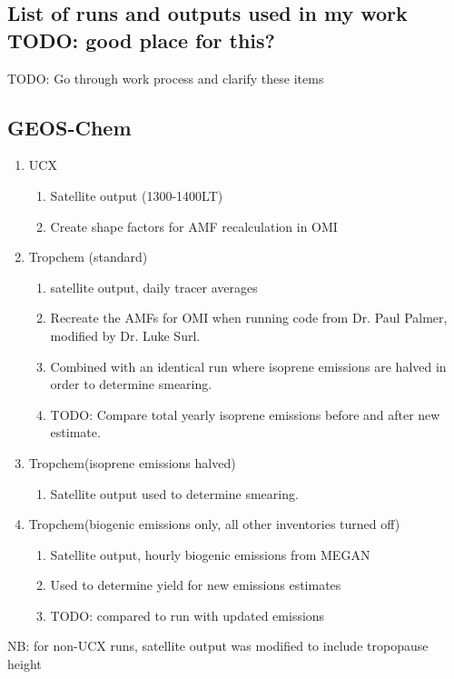   

  \subsection{List of runs and outputs used in my work TODO: good place for this?}
    TODO: Go through work process and clarify these items
    \subsection{GEOS-Chem}
      \begin{enumerate}
        \item UCX 
        \begin{enumerate}
          \item Satellite output (1300-1400LT)
          \item Create shape factors for AMF recalculation in OMI
        \end{enumerate}
        
        \item Tropchem (standard)
        \begin{enumerate}
          \item satellite output, daily tracer averages
          \item Recreate the AMFs for OMI when running code from Dr. Paul Palmer, modified by Dr. Luke Surl.
          \item Combined with an identical run where isoprene emissions are halved in order to determine smearing.
          \item TODO: Compare total yearly isoprene emissions before and after new estimate.
        \end{enumerate}
      
        \item Tropchem(isoprene emissions halved)
        \begin{enumerate}
          \item Satellite output used to determine smearing.
        \end{enumerate}
      
        \item Tropchem(biogenic emissions only, all other inventories turned off)
        \begin{enumerate}
          \item Satellite output, hourly biogenic emissions from MEGAN
          \item Used to determine yield for new emissions estimates
          \item TODO: compared to run with updated emissions
        \end{enumerate}
      \end{enumerate}
      NB: for non-UCX runs, satellite output was modified to include tropopause height

